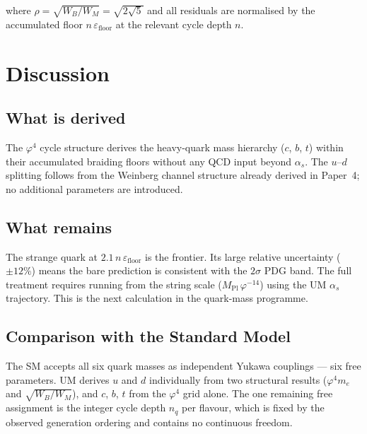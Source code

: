 \documentclass[12pt]{article}
\begin{document}
where $\rho = \sqrt{W_B/W_M} = \sqrt{2\sqrt{5}}$ and all residuals are
normalised by the accumulated floor $n\,\varepsilon_{\text{floor}}$ at the
relevant cycle depth $n$.

\section{Discussion}

\subsection{What is derived}

The $\varphi^4$ cycle structure derives the heavy-quark mass hierarchy
($c$, $b$, $t$) within their accumulated braiding floors without any QCD
input beyond $\alpha_s$. The $u$--$d$ splitting follows from the Weinberg
channel structure already derived in Paper~4; no additional parameters are
introduced.

\subsection{What remains}

The strange quark at $2.1\,n\,\varepsilon_{\text{floor}}$ is the frontier.
Its large relative uncertainty ($\pm 12\%$) means the bare prediction is
consistent with the $2\sigma$ PDG band. The full treatment requires running
from the string scale ($M_\text{Pl}\,\varphi^{-14}$) using the UM
$\alpha_s$ trajectory. This is the next calculation in the quark-mass
programme.

\subsection{Comparison with the Standard Model}

The SM accepts all six quark masses as independent Yukawa couplings —
six free parameters. UM derives $u$ and $d$ individually from two
structural results ($\varphi^4 m_e$ and $\sqrt{W_B/W_M}$), and $c$, $b$, $t$
from the $\varphi^4$ grid alone. The one remaining free assignment is the
integer cycle depth $n_q$ per flavour, which is fixed by the observed
generation ordering and contains no continuous freedom.
\end{document}
